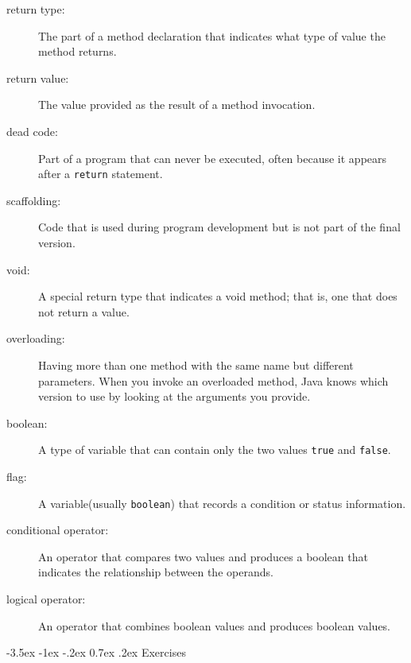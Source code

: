 \documentclass{book}
\makeatletter
\renewcommand{\section}{\@startsection 
    {section} {1} {0mm}%
    {-3.5ex \@plus -1ex \@minus -.2ex}%
    {0.7ex \@plus.2ex}%
    {\normalfont\Large\bfseries}}
\makeatother
\begin{document}
\begin{description}

\item[return type:]  The part of a method declaration that indicates
what type of value the method returns.

\item[return value:]  The value provided as the result of a method
invocation.

\item[dead code:]  Part of a program that can never be executed,
often because it appears after a {\tt return} statement.

\item[scaffolding:]  Code that is used during program development
but is not part of the final version.

\item[void:]  A special return type that indicates a void method;
that is, one that does not return a value.

\item[overloading:]  Having more than one method with the same name
but different parameters.  When you invoke an overloaded method,
Java knows which version to use by looking at the arguments you
provide.

\item[boolean:]  A type of variable that can contain only the two
values {\tt true} and {\tt false}.

\item[flag:]  A variable(usually {\tt boolean}) that records
a condition or status information.

\item[conditional operator:]  An operator that compares two values
and produces a boolean that indicates the relationship between the
operands.

\item[logical operator:]  An operator that combines boolean values
and produces boolean values.



\end{description}


\section{Exercises}
\end{document}
